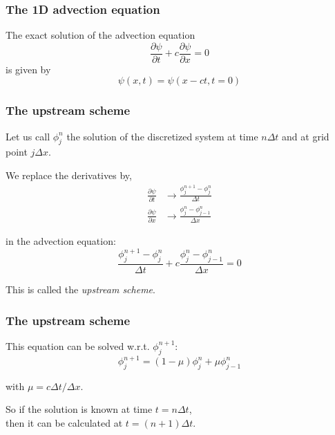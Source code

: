 \documentclass[aspectratio=149,9pt]{beamer}
\begin{document}
%
%
\begin{frame}
	\frametitle{The 1D advection equation}
	The exact solution of the advection equation\vspace*{2ex}
	\begin{equation*}
		\frac{\partial \psi}{\partial t}+c\frac{\partial\psi}{\partial x}=0
	\end{equation*}\vspace*{2ex}
	is given by\vspace*{2ex}
	\begin{equation*}
		\psi(x,t) = \psi(x-ct,t=0)
	\end{equation*}
\end{frame}
%
%
\begin{frame}
	\frametitle{The upstream scheme}
	Let us call $\phi_j^n$ the solution of the discretized system at time $n \Delta t$ and at grid point $j \Delta x$.\vspace*{2ex}
	\par
	We replace the derivatives by,\vspace*{2ex}
	\begin{align*}
		\frac{\partial \psi}{\partial t} &\rightarrow \frac{\phi_j^{n+1} - \phi_j^n}{\Delta t}\\
		\frac{\partial \psi}{\partial x} &\rightarrow  \frac{\phi_j^n - \phi_{j-1}^n}{\Delta x}
	\end{align*}\par\vspace*{2ex}
	in the advection equation:\vspace*{2ex}
	\begin{equation*}
		\frac{\phi_j^{n+1} - \phi_j^n}{\Delta t}
		+ c \frac{\phi_j^n - \phi_{j-1}^n}{\Delta x} = 0
	\end{equation*}\par\vspace*{2ex}
	This is called the \emph{upstream scheme}.
\end{frame}
%
%
\begin{frame}
	\frametitle{The upstream scheme}
	This equation can be solved w.r.t. $\phi_j^{n+1}$:\vspace*{2ex}
	\begin{equation*}
		\phi_j^{n+1} = (1-\mu) \phi_j^n + \mu \phi_{j-1}^n
	\end{equation*}\par\vspace*{2ex}
	with $\mu = c \Delta t / \Delta x$.
	\par\vspace*{2ex}
	So if the solution is known at time $t=n\Delta t$,\\ then it can be calculated at $t=(n+1)\Delta t$.
\end{frame}
\end{document}
